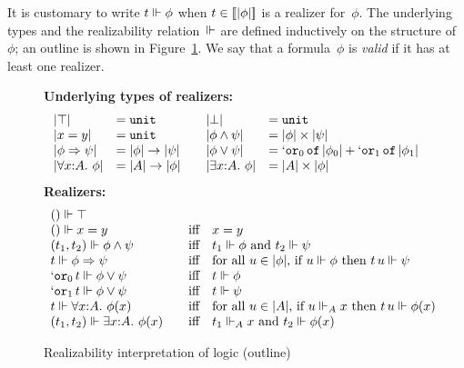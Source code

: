 It is customary to write $t \Vdash \phi$ when $t \in
[\![|\phi|]\!]$ is a realizer for~$\phi$. The underlying types
and the realizability relation~$\Vdash$ are defined inductively on the
structure of~$\phi$; an outline is shown in Figure~\ref{fig:rz-logic}.
We say that a formula~$\phi$ is \emph{valid} if it has at least one
realizer.
%
\begin{figure}[t]
  \textbf{Underlying types of realizers:}
\[
  \begin{array}{ll@{\qquad}ll}
    \typeOf{\itrue} &= \mathtt{unit} &
    \typeOf{\ifalse} &= \mathtt{unit} \\
    \typeOf{\iequal{x}{y}} &= \mathtt{unit} &
    \typeOf{\iand{\phi}{\psi}} &= \oprod{\typeOf{\phi}}{\typeOf{\psi}} \\
    \typeOf{\iimply{\phi}{\psi}} &= \oarrow{\typeOf{\phi}}{\typeOf{\psi}} &
    \typeOf{\ior{\phi}{\psi}} &=
    \osumtyx{\mathtt{or}_0}{\typeOf{\phi_0}}{\mathtt{or}_1}{\typeOf{\phi_1}} \\
    \typeOf{\iforall{x}{A}{\phi}} &= \oarrow{\typeOf{A}}{\typeOf{\phi}} &
    \typeOf{\iexists{x}{A}{\phi}} &= \oprod{\typeOf{A}}{\typeOf{\phi}}
  \end{array}
\]
  \textbf{Realizers:}
\[
  \begin{array}{ll}
    () \Vdash \top & \\
    () \Vdash x = y
    &\quad\text{iff}\quad 
    x = y
    \\
    (t_1,t_2) \Vdash \phi\land \psi
    &\quad\text{iff}\quad
    \text{$t_1 \Vdash \phi$ and $t_2 \Vdash \psi$}
    \\
    t \Vdash \phi\Rightarrow \psi
    &\quad\text{iff}\quad
    \text{for all $u \in |\phi|$, if $u \Vdash \phi$ then $t\,u
      \Vdash \psi$}
    \\
    `\mathtt{or}_0\,t \Vdash \phi\lor \psi
    &\quad\text{iff}\quad
    \text{$t \Vdash \phi$}
    \\
    `\mathtt{or}_1\,t \Vdash \phi\lor \psi
    &\quad\text{iff}\quad
    \text{$t \Vdash \psi$}
    \\
    t \Vdash \forall x{:}A.\ \phi(x)
    &\quad\text{iff}\quad
    \text{for all $u \in |A|$, if $u \Vdash_A x$ then $t\,u \Vdash \phi(x)$}
    \\
    (t_1, t_2) \Vdash \exists x{:}A.\ \phi(x)
    &\quad\text{iff}\quad
    \text{$t_1 \Vdash_A x$ and $t_2 \Vdash \phi(x)$}
  \end{array}
\]
  \caption{Realizability interpretation of logic (outline)}
  \label{fig:rz-logic}
\end{figure}

